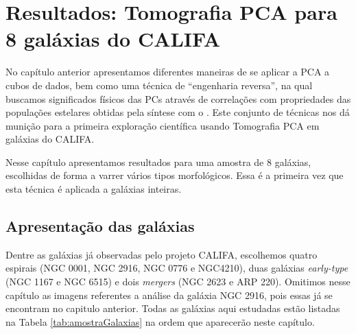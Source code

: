


\chapter{Resultados: Tomografia PCA para 8 galáxias do CALIFA}
\label{sec:result}

No capítulo anterior apresentamos diferentes maneiras de se aplicar a PCA a cubos de dados, bem como uma técnica de
``engenharia reversa'', na qual buscamos significados físicos das PCs através de correlações com propriedades das
populações estelares obtidas pela síntese com o \starlight. Este conjunto de técnicas nos dá munição para a primeira
exploração científica usando Tomografia PCA em galáxias do CALIFA. 

Nesse capítulo apresentamos resultados para uma amostra de 8 galáxias, escolhidas de forma a varrer vários tipos
morfológicos. Essa é a primeira vez que esta técnica é aplicada a galáxias inteiras.

\section{Apresentação das galáxias}
\label{sec:result:apres}

Dentre as galáxias já observadas pelo projeto CALIFA, escolhemos quatro espirais (NGC 0001, NGC 2916, NGC 0776 e
NGC4210), duas galáxias {\em early-type} (NGC 1167 e NGC 6515) e dois {\em mergers} (NGC 2623 e ARP 220). Omitimos nesse
capítulo as imagens referentes a análise da galáxia NGC 2916, pois essas já se encontram no capitulo anterior. Todas as
galáxias aqui estudadas estão listadas na Tabela \ref{tab:amostraGalaxias} na ordem que aparecerão neste capítulo.

